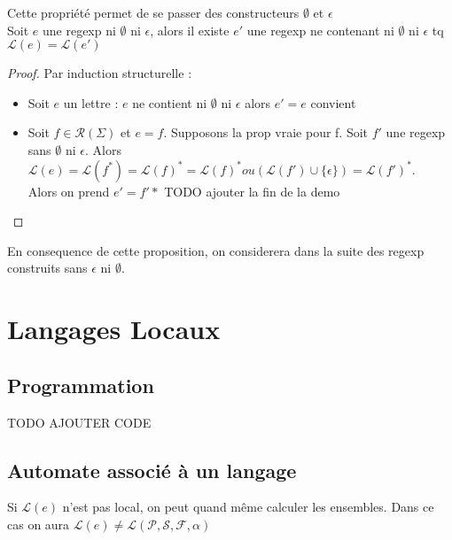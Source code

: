 \begin{proposition}
    Cette propriété permet de se passer des constructeurs $\emptyset$ et $\epsilon$\\
    Soit $e$ une regexp ni $\emptyset$ ni $\epsilon$, alors il existe $e'$ une regexp ne contenant ni $\emptyset$ ni $\epsilon$ tq $\mathcal{L}(e) = \mathcal{L}(e')$
\end{proposition}

\begin{proof}
    Par induction structurelle : \\

    \begin{itemize}
        \item Soit $e$ un lettre : $e$ ne contient ni $\emptyset$ ni $\epsilon$ alors $e'=e$ convient
        \item Soit $f\in \mathcal{R}(\Sigma)$ et $e=f$. Supposons la prop vraie pour f. Soit $f'$ une regexp sans $\emptyset$ ni $\epsilon$. Alors $\mathcal{L}(e) = \mathcal{L}(f^*)=\mathcal{L}(f)^*=\mathcal{L}(f)^* ou (\mathcal{L}(f')\cup\{\epsilon\})=\mathcal{L}(f')^*$.\\ Alors on prend $e'=f'*$
    TODO ajouter la fin de la demo
    \end{itemize}
\end{proof}

En consequence de cette proposition, on considerera dans la suite des regexp construits sans $\epsilon$ ni $\emptyset$.\\

\section{Langages Locaux}
\subsection{Programmation}

TODO AJOUTER CODE

\subsection{Automate associé à un langage}

\begin{remark}
    Si $\mathcal{L}(e)$ n'est pas local, on peut quand même calculer les ensembles. Dans ce cas on aura $\mathcal{L}(e) \not= \mathcal{L}(\mathcal{P},\mathcal{S},\mathcal{F},\alpha)$
\end{remark}

